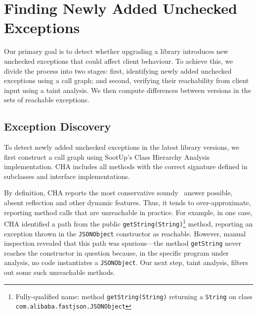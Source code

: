 \section{Finding Newly Added Unchecked Exceptions}

Our primary goal is to detect whether upgrading a library introduces new unchecked exceptions that could affect client behaviour. To achieve this, we divide the process into two stages: first, identifying newly added unchecked exceptions using a call graph; and second, verifying their reachability from client input using a taint analysis. We then compute differences between versions in the sets of reachable exceptions.

\subsection{Exception Discovery}

To detect newly added unchecked exceptions in the latest library versions, we first construct a call graph using SootUp's Class Hierarchy Analysis implementation. CHA includes all methods with the correct signature defined in subclasses and interface implementations.


By definition, CHA reports the most conservative soundy~\cite{livshits15:_in} answer possible, absent reflection and other dynamic features. Thus, it tends to over-approximate, reporting method calls that are unreachable in practice. For example, in one case, CHA identified a path from the public \texttt{getString(String)}\footnote{Fully-qualified name: method \texttt{getString(String)} returning a \texttt{String} on class \texttt{com.alibaba.fastjson.JSONObject}} method, reporting an exception thrown in the \texttt{JSONObject} constructor as reachable. However, manual inspection revealed that this path was spurious—the method \texttt{getString} never reaches the constructor in question because, in the specific program under analysis, no code instantiates a \texttt{JSONObject}. Our next step, taint analysis, filters out some such unreachable methods.


